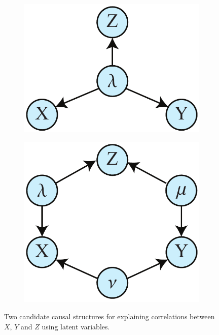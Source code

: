 \documentclass[12pt,onecolumn,nofootinbib]{revtex4-2}
\begin{document}
\begin{figure}[h]
	        \begin{subfigure}[b]{0.2\textwidth}
                	\centering
                	\includegraphics[width=\textwidth]{XYZ-hvar1}
		\end{subfigure}
		\hspace{8em}
		\begin{subfigure}[b]{0.2\textwidth}
                	\centering
                	\includegraphics[width=\textwidth]{XYZ-hvar2}
		\end{subfigure}
 \caption{Two candidate causal structures for explaining correlations between $X$, $Y$ and $Z$ using latent variables.}
       \label{fig:XYZ-hvar}
\end{figure}
\end{document}
